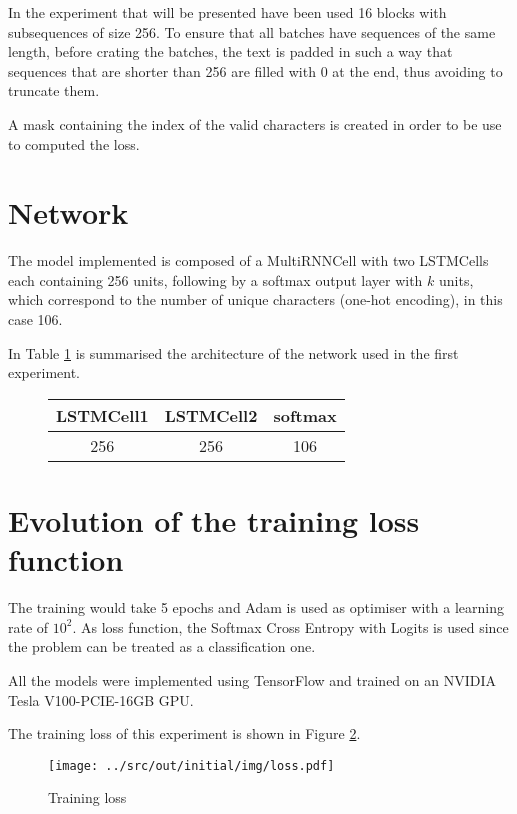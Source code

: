\documentclass[a4paper,12pt]{article} %
\begin{document}
	In the experiment that will be presented have been used 16 blocks with 
	subsequences of size 256. 
	To ensure that all batches have sequences of the same length, before 
	crating the batches, the text is padded in such a way that sequences that 
	are shorter than 256 are filled with 0 at the end, thus avoiding to 
	truncate them.
	
	A mask containing the index of the valid characters is created in order to 
	be use to computed the loss.
	
	\section{Network}
	\label{section:network}
	
	The model implemented is composed of a MultiRNNCell with two LSTMCells each 
	containing 256 units, following by a softmax output layer with $k$ units, 
	which correspond to the number of unique characters (one-hot encoding), in 
	this case 106.
	
	In Table \ref{tab:model0} is summarised the architecture of the network 
	used in the first experiment.	
	\begin{figure}[H]
		\centering
		
		\begin{tabular}{ccc}
			\toprule
			\textbf{LSTMCell1} & \textbf{LSTMCell2} & \textbf{softmax} \\
			\midrule
			256 & 256 & 106\\
			\bottomrule
		\end{tabular}
		\label{tab:model0}
	\end{figure}

	\section{Evolution of the training loss function}
	\label{section:loss}

	The training would take 5 epochs and Adam is used as optimiser with a 
	learning rate of $10^2$. As loss function, the Softmax Cross Entropy with 
	Logits is used since the problem can be treated as a classification one.
	
	All the models were implemented using TensorFlow and trained on an NVIDIA 
	Tesla V100-PCIE-16GB GPU.
	
	The training loss of this experiment is shown in Figure 
	\ref{fig:model0-loss}.
	
	\begin{figure}[htb]
		\centering
		\texttt{[image: ../src/out/initial/img/loss.pdf]}	
		\caption{Training loss}
		\label{fig:model0-loss}
	\end{figure}
\end{document}
